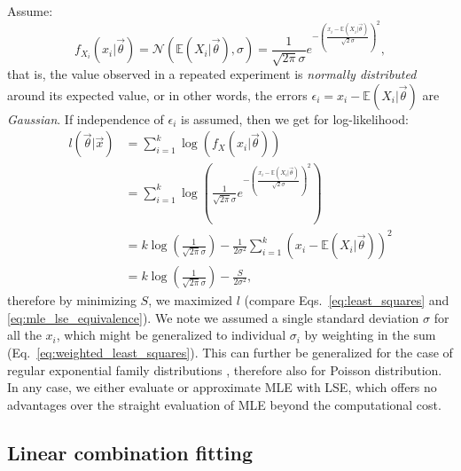 Assume: 
\begin{equation}
    f_{X_i}(x_i|\vec{\theta}) = \mathcal{N}(\mathbb{E}(X_i|\vec{\theta}),\sigma) = \frac{1}{\sqrt{2 \pi} \sigma} e^{-\left( \frac{x_i - \mathbb{E}(X_i|\vec{\theta})}{\sqrt{2} \sigma} \right)^2},
\end{equation}
that is, the value observed in a repeated experiment is \textit{normally distributed} around its expected value, or in other words, the errors $\epsilon_i = x_i - \mathbb{E}(X_i|\vec{\theta})$ are \textit{Gaussian}. If independence of $\epsilon_i$ is assumed, then we get for log-likelihood:
\begin{equation}\begin{split}
    l(\vec{\theta}|\vec{x}) 
    &= \sum_{i=1}^{k} \log \left( f_X(x_i|\vec{\theta}) \right)  \\
    &= \sum_{i=1}^{k} \log \left( \frac{1}{\sqrt{2 \pi} \sigma} e^{-\left( \frac{x_i - \mathbb{E}(X_i|\vec{\theta})}{\sqrt{2} \sigma} \right)^2} \right) \\
    &= k\log\left(\frac{1}{\sqrt{2 \pi} \sigma}\right) - \frac{1}{2 \sigma^2} \sum_{i=1}^{k} \left(  x_i - \mathbb{E}(X_i|\vec{\theta}) \right)^2 \\
    &= k\log\left(\frac{1}{\sqrt{2 \pi} \sigma}\right) - \frac{S}{2 \sigma^2}, \label{eq:mle_lse_equivalence}
\end{split}\end{equation}
therefore by minimizing $S$, we maximized $l$ (compare Eqs.~\ref{eq:least_squares} and \ref{eq:mle_lse_equivalence}). We note we assumed a single standard deviation $\sigma$ for all the $x_i$, which might be generalized to individual $\sigma_i$ by weighting in the sum (Eq.~\ref{eq:weighted_least_squares}). This can further be generalized for the case of regular exponential family distributions \citep{charnes1976equivalence}, therefore also for Poisson distribution. In any case, we either evaluate or approximate MLE with LSE, which offers no advantages over the straight evaluation of MLE beyond the computational cost.

\subsection{Linear combination fitting}

